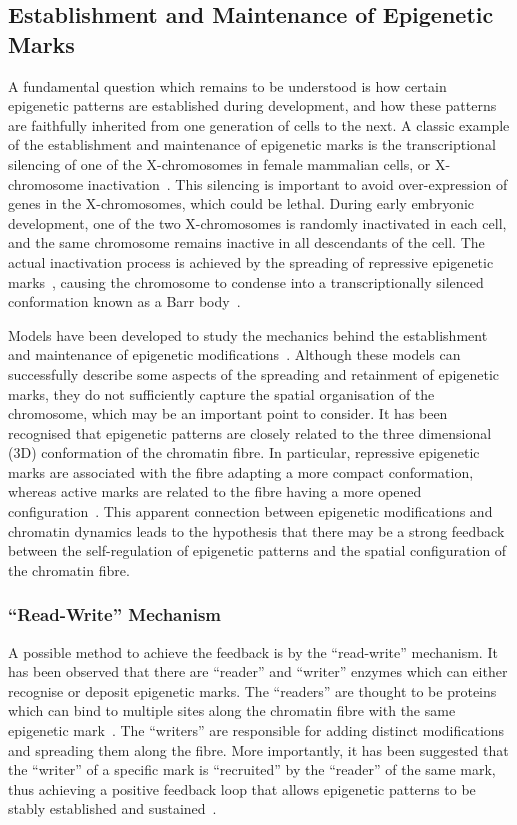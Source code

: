 \documentclass[12pt]{article}
\begin{document}
\subsection{Establishment and Maintenance of Epigenetic Marks}
\label{sec:establishment}
A fundamental question which remains to be understood is how certain epigenetic patterns are established during development, and how these patterns are faithfully inherited from one generation of cells to the next. A classic example of the establishment and maintenance of epigenetic marks is the transcriptional silencing of one of the X-chromosomes in female mammalian cells, or X-chromosome inactivation~\cite{avner2001}. This silencing is important to avoid over-expression of genes in the X-chromosomes, which could be lethal. During early embryonic development, one of the two X-chromosomes is randomly inactivated in each cell, and the same chromosome remains inactive in all descendants of the cell. The actual inactivation process is achieved by the spreading of repressive epigenetic marks~\cite{heard2001, nicodemi2007}, causing the chromosome to condense into a transcriptionally silenced conformation known as a Barr body~\cite{avner2001}. 

Models have been developed to study the mechanics behind the establishment and maintenance of epigenetic modifications~\cite{dodd2007, hathaway2012, zhang2014, jost2014}. Although these models can successfully describe some aspects of the spreading and retainment of epigenetic marks, they do not sufficiently capture the spatial organisation of the chromosome, which may be an important point to consider. It has been recognised that epigenetic patterns are closely related to the three dimensional (3D) conformation of the chromatin fibre. In particular, repressive epigenetic marks are associated with the fibre adapting a more compact conformation, whereas active marks are related to the fibre having a more opened configuration~\cite{cortini2016, shahbazian2007, hathaway2012}. This apparent connection between epigenetic modifications and chromatin dynamics leads to the hypothesis that there may be a strong feedback between the self-regulation of epigenetic patterns and the spatial configuration of the chromatin fibre.%

\subsubsection{``Read-Write'' Mechanism}
\label{sec:read-write}
A possible method to achieve the feedback is by the ``read-write'' mechanism. It has been observed that there are ``reader'' and ``writer'' enzymes which can either recognise or deposit epigenetic marks. The ``readers'' are thought to be proteins which can bind to multiple sites along the chromatin fibre with the same epigenetic mark~\cite{brackley2013}. The ``writers'' are responsible for adding distinct modifications and spreading them along the fibre. More importantly, it has been suggested that the ``writer'' of a specific mark is ``recruited'' by the ``reader'' of the same mark, thus achieving a positive feedback loop that allows epigenetic patterns to be stably established and sustained~\cite{dodd2007, hathaway2012}. 
\end{document}
